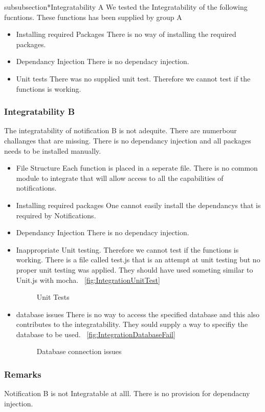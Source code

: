 subsubsection*{Integratability A}
We tested the Integratability of the following fucntions. These functions has been supplied by group A
\begin{itemize}
	\item Installing required Packages
	There is no way of installing the required packages.
	\item Dependancy Injection
	There is no dependacy injection.
	\item Unit tests
	There was no supplied unit test. Therefore we cannot test if the functions is working.
\end{itemize}
\subsubsection*{Integratability B}
The integratability of notification B is not adequite. There are numerbour challanges that are missing. There is no dependancy injection and all packages needs to be installed manually.
\begin{itemize}
	\item {File Structure} 
	Each function is placed in a seperate file. There is no common module to integrate that will allow access to all the capabilities of notifications.
	\item Installing required packages
	One cannot easily install the dependancys that is required by Notifications.
	\item Dependancy Injection
	There is no dependacy injection.
	\item
	Inappropriate Unit testing. Therefore we cannot test if the functions is working. There is a file called test.js that is an attempt at unit testing but no proper unit testing was applied. They should have used someting similar to Unit.js with mocha.
		~\ref{fig:IntegrationUnitTest}
		\begin{figure}[H]
			\centering
			\caption{Unit Tests}
			\label{fig:scope}
		\end{figure}
	\item database issues
	There is no way to access the specified database and this also contributes to the integratability. They sould supply a way to specifiy the database to be used.
		~\ref{fig:IntegrationDatabaseFail}
		\begin{figure}[H]
			\centering
			\caption{Database connection issues}
			\label{fig:scope}
		\end{figure}
\end{itemize}
\subsubsection*{Remarks}
Notification B is not Integratable at alll. There is no provision for dependacny injection.